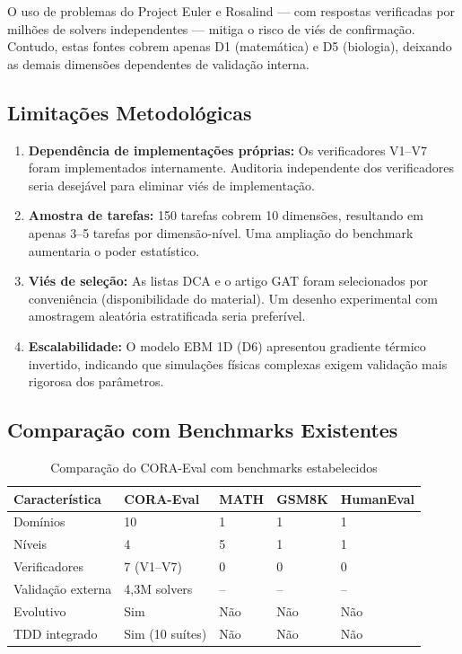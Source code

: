 \documentclass[12pt,a4paper,oneside]{article}
\begin{document}
O uso de problemas do Project Euler e Rosalind — com respostas verificadas por
milhões de solvers independentes — mitiga o risco de viés de confirmação.
Contudo, estas fontes cobrem apenas D1 (matemática) e D5 (biologia), deixando
as demais dimensões dependentes de validação interna.

\subsection{Limitações Metodológicas}

\begin{enumerate}[label=(\roman*)]
\item \textbf{Dependência de implementações próprias:} Os verificadores V1--V7
      foram implementados internamente. Auditoria independente dos verificadores
      seria desejável para eliminar viés de implementação.
\item \textbf{Amostra de tarefas:} 150 tarefas cobrem 10 dimensões, resultando
      em apenas 3--5 tarefas por dimensão-nível. Uma ampliação do benchmark
      aumentaria o poder estatístico.
\item \textbf{Viés de seleção:} As listas DCA e o artigo GAT foram selecionados
      por conveniência (disponibilidade do material). Um desenho experimental
      com amostragem aleatória estratificada seria preferível.
\item \textbf{Escalabilidade:} O modelo EBM 1D (D6) apresentou gradiente
      térmico invertido, indicando que simulações físicas complexas exigem
      validação mais rigorosa dos parâmetros.
\end{enumerate}

\subsection{Comparação com Benchmarks Existentes}

\begin{table}[H]
\centering
\caption{Comparação do CORA-Eval com benchmarks estabelecidos}
\label{tab:comparacao}
\begin{tabular}{p{}p{}p{}p{}p{}}
\toprule
\textbf{Característica} & \textbf{CORA-Eval} & \textbf{MATH} & \textbf{GSM8K} & \textbf{HumanEval} \\
\midrule
Domínios & 10 & 1 & 1 & 1 \\
Níveis & 4 & 5 & 1 & 1 \\
Verificadores & 7 (V1--V7) & 0 & 0 & 0 \\
Validação externa & 4,3M solvers & -- & -- & -- \\
Evolutivo & Sim & Não & Não & Não \\
TDD integrado & Sim (10 suítes) & Não & Não & Não \\
\bottomrule
\end{tabular}
\end{table}
\end{document}
